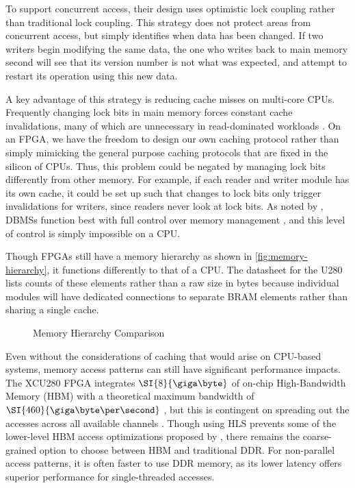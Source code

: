 To support concurrent access, their design uses optimistic lock coupling rather
than traditional lock coupling. This strategy does not protect areas from
concurrent access, but simply identifies when data has been changed. If two
writers begin modifying the same data, the one who writes back to main memory
second will see that its version number is not what was expected, and attempt to
restart its operation using this new data.

A key advantage of this strategy is reducing cache misses on multi-core CPUs.
Frequently changing lock bits in main memory forces constant cache
invalidations, many of which are unnecessary in read-dominated workloads
\autocite{leis-damon-2016}. On an FPGA, we have the freedom to design our own
caching protocol rather than simply mimicking the general purpose caching
protocols that are fixed in the silicon of CPUs. Thus, this problem could be
negated by managing lock bits differently from other memory.
%
For example, if each reader and writer module has its own cache, it could be set
up such that changes to lock bits only trigger invalidations for writers, since
readers never look at lock bits. As noted by \citeauthor{binnig-vldb-2016},
DBMSs function best with full control over memory management
\autocite{binnig-vldb-2016}, and this level of control is simply impossible on a
CPU.


\label{subsec:memory-layout}

Though FPGAs still have a memory hierarchy as shown in
\autoref{fig:memory-hierarchy}, it functions differently to that of a CPU. The
datasheet for the U280 lists counts of these elements rather than a raw size in
bytes because individual modules will have dedicated connections to separate
BRAM elements rather than sharing a single cache.

\begin{figure}[H]
	\centering
	
	\caption{Memory Hierarchy Comparison}
	\label{fig:memory-hierarchy}
\end{figure}

Even without the considerations of caching that would arise on CPU-based
systems, memory access patterns can still have significant performance impacts.
The XCU280 FPGA integrates $\SI{8}{\giga\byte}$ of on-chip High-Bandwidth Memory
(HBM) with a theoretical maximum bandwidth of $\SI{460}{\giga\byte\per\second}$
\autocite{u280}, but this is contingent on spreading out the accesses across all
available channels \autocite{holzinger-ipdpsw-2021}.
%
Though using HLS prevents some of the lower-level HBM access optimizations
proposed by \citeauthor{holzinger-ipdpsw-2021} \autocite{holzinger-ipdpsw-2021},
there remains the coarse-grained option to choose between HBM and traditional
DDR. For non-parallel access patterns, it is often faster to use DDR memory, as
its lower latency offers superior performance for single-threaded accesses.

